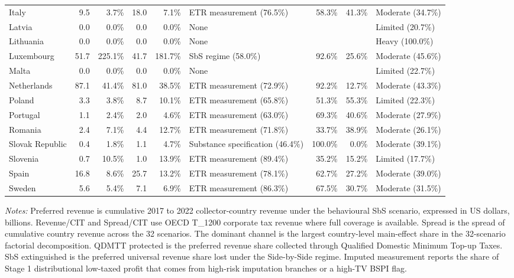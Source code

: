 \begin{table}[H]
\begin{adjustbox}{max width=\textwidth,center}
\begin{tabular}{@{}lrrrrlrrl@{}}
Italy &  9.5 &   3.7\% & 18.0 &   7.1\% & ETR measurement (76.5\%) &  58.3\% & 41.3\% & Moderate (34.7\%) \\
Latvia &  0.0 &   0.0\% &  0.0 &   0.0\% & None &  &  & Limited (20.7\%) \\
Lithuania &  0.0 &   0.0\% &  0.0 &   0.0\% & None &  &  & Heavy (100.0\%) \\
Luxembourg & 51.7 & 225.1\% & 41.7 & 181.7\% & SbS regime (58.0\%) &  92.6\% & 25.6\% & Moderate (45.6\%) \\
Malta &  0.0 &   0.0\% &  0.0 &   0.0\% & None &  &  & Limited (22.7\%) \\
Netherlands & 87.1 &  41.4\% & 81.0 &  38.5\% & ETR measurement (72.9\%) &  92.2\% & 12.7\% & Moderate (43.3\%) \\
Poland &  3.3 &   3.8\% &  8.7 &  10.1\% & ETR measurement (65.8\%) &  51.3\% & 55.3\% & Limited (22.3\%) \\
Portugal &  1.1 &   2.4\% &  2.0 &   4.6\% & ETR measurement (63.0\%) &  69.3\% & 40.6\% & Moderate (27.9\%) \\
Romania &  2.4 &   7.1\% &  4.4 &  12.7\% & ETR measurement (71.8\%) &  33.7\% & 38.9\% & Moderate (26.1\%) \\
Slovak Republic &  0.4 &   1.8\% &  1.1 &   4.7\% & Substance specification (46.4\%) & 100.0\% &  0.0\% & Moderate (39.1\%) \\
Slovenia &  0.7 &  10.5\% &  1.0 &  13.9\% & ETR measurement (89.4\%) &  35.2\% & 15.2\% & Limited (17.7\%) \\
Spain & 16.8 &   8.6\% & 25.7 &  13.2\% & ETR measurement (78.1\%) &  62.7\% & 27.2\% & Moderate (39.0\%) \\
Sweden &  5.6 &   5.4\% &  7.1 &   6.9\% & ETR measurement (86.3\%) &  67.5\% & 30.7\% & Moderate (31.5\%) \\
\bottomrule
\end{tabular}
\end{adjustbox}

\vspace{0.5em}
\begin{minipage}{0.96\textwidth}
\footnotesize\raggedright \textit{Notes:} Preferred revenue is cumulative 2017 to 2022 collector-country revenue under the behavioural SbS scenario, expressed in US dollars, billions. Revenue/CIT and Spread/CIT use OECD T\_1200 corporate tax revenue where full coverage is available. Spread is the spread of cumulative country revenue across the 32 scenarios. The dominant channel is the largest country-level main-effect share in the 32-scenario factorial decomposition. QDMTT protected is the preferred revenue share collected through Qualified Domestic Minimum Top-up Taxes. SbS extinguished is the preferred universal revenue share lost under the Side-by-Side regime. Imputed measurement reports the share of Stage 1 distributional low-taxed profit that comes from high-risk imputation branches or a high-TV BSPI flag.
\end{minipage}
\end{table}
